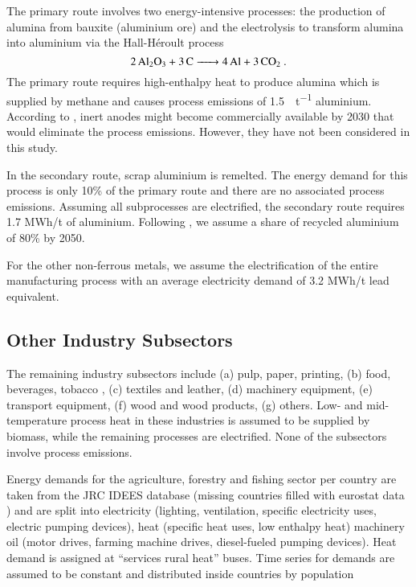 The primary route involves two energy-intensive processes: the production of
alumina from bauxite (aluminium ore) and the electrolysis to transform alumina
into aluminium via the  Hall-H\'{e}roult process
\begin{equation}
    \ce{2Al2O3 + 3C -> 4Al + 3\co}.
\end{equation}
The primary route requires high-enthalpy heat  to produce
alumina which is supplied by methane and causes process emissions of
\SI{1.5}{\tco\per\tonne} aluminium. According to  ,
inert anodes might become commercially available by 2030 that would eliminate
the process emissions. However, they have not been considered in this study.

In the secondary route, scrap aluminium is remelted. The energy demand for this
process is only 10\% of the primary route and there are no associated process
emissions. Assuming all subprocesses are electrified, the secondary route
requires 1.7 MWh/t of aluminium. Following , we assume
a share of recycled aluminium of 80\% by 2050.

For the other non-ferrous metals, we assume the electrification of the entire
manufacturing process with an average electricity demand of 3.2 MWh/t lead
equivalent. 

\subsection{Other Industry Subsectors}
\label{sec:si:industry:other}

The remaining industry subsectors include
(a) pulp, paper, printing,
(b) food, beverages, tobacco ,
(c) textiles and leather,
(d) machinery equipment,
(e) transport equipment,
(f) wood and wood products,
(g) others.
Low- and mid-temperature process heat in these industries is assumed to be supplied by biomass,
while the remaining processes are electrified.
None of the subsectors involve process emissions.

Energy demands for the agriculture, forestry and fishing sector per country are
taken from the JRC IDEES database \citeS{} (missing countries filled with
eurostat data \citeS{}) and are split into electricity (lighting, ventilation,
specific electricity uses, electric pumping devices), heat (specific heat uses,
low enthalpy heat) machinery oil (motor drives, farming machine drives,
diesel-fueled pumping devices). Heat demand is assigned at “services rural heat”
buses. Time series for demands are assumed to be constant and distributed inside
countries by population

